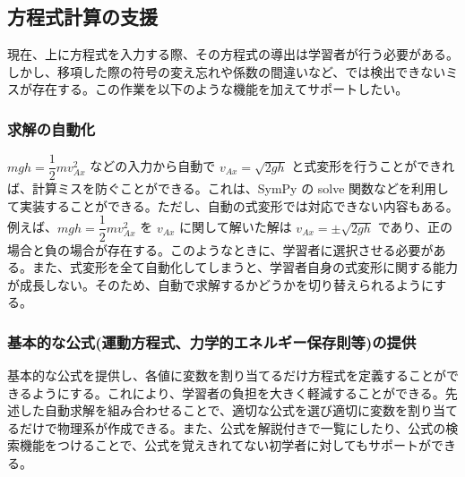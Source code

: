 \subsection{方程式計算の支援}

現在、\simname 上に方程式を入力する際、その方程式の導出は学習者が行う必要がある。しかし、移項した際の符号の変え忘れや係数の間違いなど、\simname では検出できないミスが存在する。この作業を以下のような機能を加えてサポートしたい。

\subsubsection{求解の自動化}
$mgh = \dfrac{1}{2}mv_{Ax}^2$ などの入力から自動で $v_{Ax} = \sqrt{2gh}$ と式変形を行うことができれば、計算ミスを防ぐことができる。これは、SymPy の solve 関数などを利用して実装することができる。ただし、自動の式変形では対応できない内容もある。例えば、$mgh = \dfrac{1}{2}mv_{Ax}^2$ を $v_{Ax}$ に関して解いた解は $v_{Ax} = \pm\sqrt{2gh}$ であり、正の場合と負の場合が存在する。このようなときに、学習者に選択させる必要がある。また、式変形を全て自動化してしまうと、学習者自身の式変形に関する能力が成長しない。そのため、自動で求解するかどうかを切り替えられるようにする。

\subsubsection{基本的な公式(運動方程式、力学的エネルギー保存則等)の提供}
基本的な公式を提供し、各値に変数を割り当てるだけ方程式を定義することができるようにする。これにより、学習者の負担を大きく軽減することができる。先述した自動求解を組み合わせることで、適切な公式を選び適切に変数を割り当てるだけで物理系が作成できる。また、公式を解説付きで一覧にしたり、公式の検索機能をつけることで、公式を覚えきれてない初学者に対してもサポートができる。
